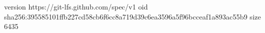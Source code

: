version https://git-lfs.github.com/spec/v1
oid sha256:395585101ffb227cd58cb6f6cc8a719d39c6ea3596a5f96bcceaf1a893ac55b9
size 6435
